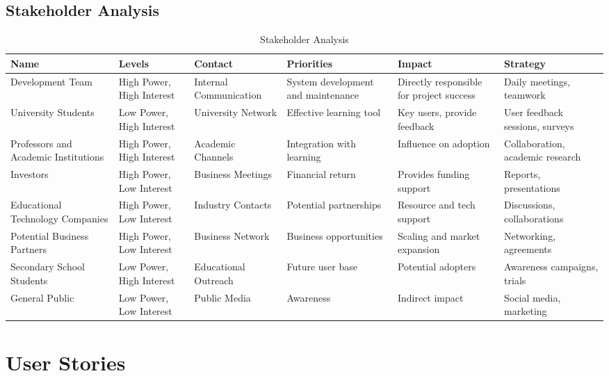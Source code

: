 \subsection{Stakeholder Analysis}

\begin{table}[ht]
    \centering
    \begin{tabularx}{\linewidth}{lXlXlX}
        \hline
        \textbf{Name} & \textbf{Levels} & \textbf{Contact} & \textbf{Priorities} & \textbf{Impact} & \textbf{Strategy} \\ 
        \hline
        Development Team & High Power, High Interest & Internal Communication & System development and maintenance & Directly responsible for project success & Daily meetings, teamwork \\ 
        University Students & Low Power, High Interest & University Network & Effective learning tool & Key users, provide feedback & User feedback sessions, surveys \\ 
        Professors and Academic Institutions & High Power, High Interest & Academic Channels & Integration with learning & Influence on adoption & Collaboration, academic research \\ 
        Investors & High Power, Low Interest & Business Meetings & Financial return & Provides funding support & Reports, presentations \\ 
        Educational Technology Companies & High Power, Low Interest & Industry Contacts & Potential partnerships & Resource and tech support & Discussions, collaborations \\ 
        Potential Business Partners & High Power, Low Interest & Business Network & Business opportunities & Scaling and market expansion & Networking, agreements \\ 
        Secondary School Students & Low Power, High Interest & Educational Outreach & Future user base & Potential adopters & Awareness campaigns, trials \\ 
        General Public & Low Power, Low Interest & Public Media & Awareness & Indirect impact & Social media, marketing \\ 
        \hline
    \end{tabularx}
    \caption{Stakeholder Analysis}
    \label{tab:stakeholder-analysis}
\end{table}

\section{User Stories}
\label{section:user-stories}

